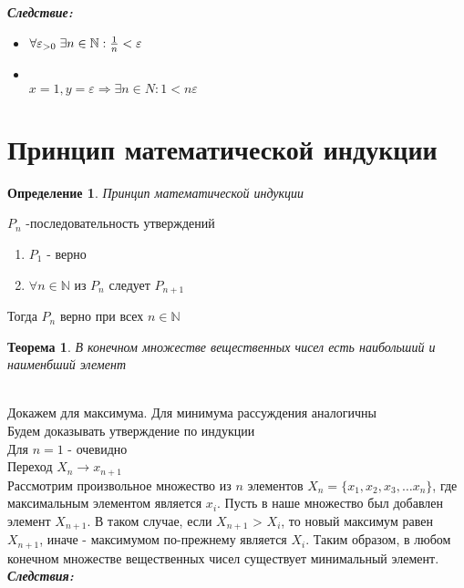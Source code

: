 \documentclass[12pt,letterpaper]{report}
\makeatletter
\newtheorem*{theorem-non}{Теорема}
\newtheorem{conj}[theorem]{Определение}
\renewenvironment{proof}[1][\proofname]{%
   \par\pushQED{\qed}\normalfont%
   \topsep6\p@\@plus6\p@\relax
   \trivlist\item[\hskip\labelsep\bfseries#1\@addpunct{.}]%
   \ignorespaces
}{%
   \popQED\endtrivlist\@endpefalse
}
\makeatother
\begin{document}
\textbf{\textit{Следствие:}}
    \begin{itemize}
        \item[] $\forall \varepsilon_{> 0} \; \exists n \in \mathbb{N}: {{1}\over{n}} < \varepsilon$
        \begin{proof}
           \quad \\ $x = 1, y = \varepsilon \Longrightarrow \exists n \in N: 1 < n\varepsilon$
        \end{proof} 
    \end{itemize}
\section{Принцип математической индукции}
\begin{conj}
    Принцип математической индукции
\end{conj}
$P_n$ -последовательность утверждений 
\begin{enumerate}
    \item $P_1$ - верно
    \item $\forall n \in \mathbb{N}$ из $P_n$ следует $P_{n+1}$
\end{enumerate}
Тогда $P_n$ верно при всех $n \in \mathbb{N}$
\begin{theorem-non}
    В конечном множестве вещественных чисел есть наибольший и наименбший элемент
\end{theorem-non}
\begin{proof}
    \quad \\
    Докажем для максимума. Для минимума рассуждения аналогичны \\
    Будем доказывать утверждение по индукции \\
    Для $n = 1$ - очевидно \\
    Переход $X_n \longrightarrow x_{n+1}$ \\
    Рассмотрим произвольное множество из $n$ элементов $X_n = \{x_1, x_2, x_3, \dots x_n\}$, где максимальным элементом 
    является $x_i$. Пусть в наше множество был добавлен элемент $X_{n+1}$. В таком случае, если $X_{n+1}$ > $X_{i}$, то новый максимум равен
    $X_{n+1}$, иначе - максимумом по-прежнему является $X_{i}$. Таким образом, в любом конечном множестве вещественных чисел существует минимальный
    элемент.     
\end{proof}
\newpage
\textbf{\textit{Следствия:}}
\end{document}
